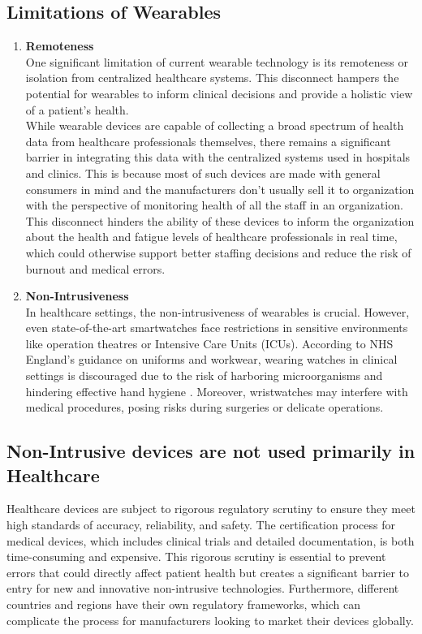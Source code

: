 \subsection{Limitations of Wearables}
\begin{enumerate}
    \item \textbf{Remoteness} \\
    One significant limitation of current wearable technology is its remoteness or isolation from centralized healthcare systems. This disconnect hampers the potential for wearables to inform clinical decisions and provide a holistic view of a patient's health. \\

    \noindent While wearable devices are capable of collecting a broad spectrum of health data from healthcare professionals themselves, there remains a significant barrier in integrating this data with the centralized systems used in hospitals and clinics. This is because most of such devices are made with general consumers in mind and the manufacturers don't usually sell it to organization with the perspective of monitoring health of all the staff in an organization. This disconnect hinders the ability of these devices to inform the organization about the health and fatigue levels of healthcare professionals in real time, which could otherwise support better staffing decisions and reduce the risk of burnout and medical errors.

    \item \textbf{Non-Intrusiveness} \\
    In healthcare settings, the non-intrusiveness of wearables is crucial. However, even state-of-the-art smartwatches face restrictions in sensitive environments like operation theatres or Intensive Care Units (ICUs). According to NHS England's guidance on uniforms and workwear, wearing watches in clinical settings is discouraged due to the risk of harboring microorganisms and hindering effective hand hygiene \cite{ref20}. Moreover, wristwatches may interfere with medical procedures, posing risks during surgeries or delicate operations.
    
\end{enumerate}

\subsection{Non-Intrusive devices are not used primarily in Healthcare}
Healthcare devices are subject to rigorous regulatory scrutiny to ensure they meet high standards of accuracy, reliability, and safety. The certification process for medical devices, which includes clinical trials and detailed documentation, is both time-consuming and expensive. This rigorous scrutiny is essential to prevent errors that could directly affect patient health but creates a significant barrier to entry for new and innovative non-intrusive technologies. Furthermore, different countries and regions have their own regulatory frameworks, which can complicate the process for manufacturers looking to market their devices globally.\\

